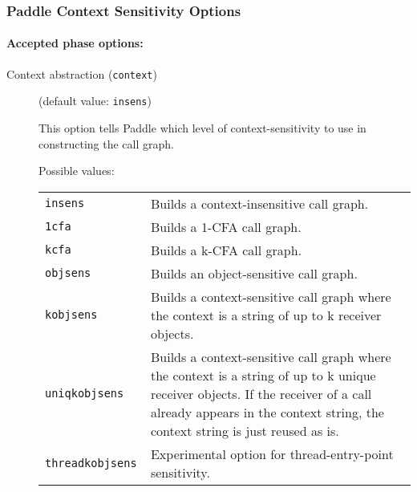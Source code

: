 \documentclass{article}
\begin{document}
\subsubsection{Paddle Context Sensitivity Options}


\paragraph{Accepted phase options:} 

\begin{description}

\item[Context abstraction ({\tt context})]
(default value: {\tt insens})




This option tells Paddle which level of context-sensitivity to use in constructing the call graph.




Possible values:\\
\begin{longtable}{p{1in}p{4in}}

{\tt insens }
&

Builds a context-insensitive call graph.
\\

{\tt 1cfa }
&

Builds a 1-CFA call graph.
\\

{\tt kcfa }
&

Builds a k-CFA call graph.
\\

{\tt objsens }
&

Builds an object-sensitive call graph.
\\

{\tt kobjsens }
&

Builds a context-sensitive call graph where the context is a string of up to
k receiver objects.
\\

{\tt uniqkobjsens }
&

Builds a context-sensitive call graph where the context is a string of up to
k unique receiver objects. If the receiver of a call already appears in the
context string, the context string is just reused as is.
\\

{\tt threadkobjsens }
&

Experimental option for thread-entry-point sensitivity.
\\


\end{longtable}
\end{description}
\end{document}
